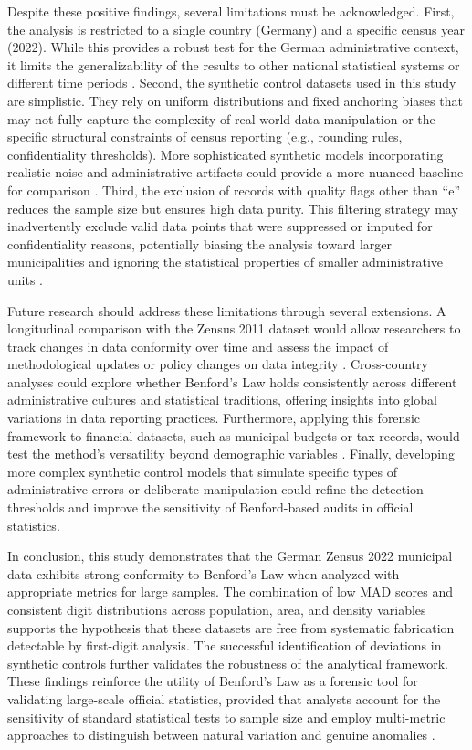 \documentclass[11pt,a4paper]{article}
\begin{document}
Despite these positive findings, several limitations must be acknowledged. First, the analysis is restricted to a single country (Germany) and a specific census year (2022). While this provides a robust test for the German administrative context, it limits the generalizability of the results to other national statistical systems or different time periods \cite{Ivanova2025BenfordsLA}. Second, the synthetic control datasets used in this study are simplistic. They rely on uniform distributions and fixed anchoring biases that may not fully capture the complexity of real-world data manipulation or the specific structural constraints of census reporting (e.g., rounding rules, confidentiality thresholds). More sophisticated synthetic models incorporating realistic noise and administrative artifacts could provide a more nuanced baseline for comparison \cite{Borsukiewicz2025BeyondRF}. Third, the exclusion of records with quality flags other than ``e'' reduces the sample size but ensures high data purity. This filtering strategy may inadvertently exclude valid data points that were suppressed or imputed for confidentiality reasons, potentially biasing the analysis toward larger municipalities and ignoring the statistical properties of smaller administrative units \cite{Judge2012DetectingPI}.

Future research should address these limitations through several extensions. A longitudinal comparison with the Zensus 2011 dataset would allow researchers to track changes in data conformity over time and assess the impact of methodological updates or policy changes on data integrity \cite{Paz2025FromAC}. Cross-country analyses could explore whether Benford's Law holds consistently across different administrative cultures and statistical traditions, offering insights into global variations in data reporting practices. Furthermore, applying this forensic framework to financial datasets, such as municipal budgets or tax records, would test the method's versatility beyond demographic variables \cite{Jianu2021ReliabilityOF}. Finally, developing more complex synthetic control models that simulate specific types of administrative errors or deliberate manipulation could refine the detection thresholds and improve the sensitivity of Benford-based audits in official statistics.

In conclusion, this study demonstrates that the German Zensus 2022 municipal data exhibits strong conformity to Benford's Law when analyzed with appropriate metrics for large samples. The combination of low MAD scores and consistent digit distributions across population, area, and density variables supports the hypothesis that these datasets are free from systematic fabrication detectable by first-digit analysis. The successful identification of deviations in synthetic controls further validates the robustness of the analytical framework. These findings reinforce the utility of Benford's Law as a forensic tool for validating large-scale official statistics, provided that analysts account for the sensitivity of standard statistical tests to sample size and employ multi-metric approaches to distinguish between natural variation and genuine anomalies \cite{Miller2015BenfordsLT}.
\end{document}
